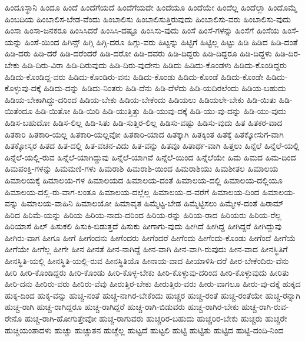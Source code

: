 {ಹಿಂದೂಸ್ಥಾನಿ
ಹಿಂದೂ
ಹಿಂದೆ
ಹಿಂದೆಗೆಯದೆ
ಹಿಂದೆಗೆಯದೇ
ಹಿಂದೆಯೂ
ಹಿಂದೆಯೇ
ಹಿಂದೆಲ್ಲ
ಹಿಂದೆಲ್ಲಾ
ಹಿಂದೊಮ್ಮೆ
ಹಿಂಬದಿಯ
ಹಿಂಬಾಲಿಸ-ಬೇಡ-ವೆಂದು
ಹಿಂಬಾಲಿಸು
ಹಿಂಬಾಲಿಸುತ್ತಿರುವುದು
ಹಿಂಬಾಲಿಸು-ವರು
ಹಿಂಬಾಲಿಸು-ವುದು
ಹಿಂಸಾ
ಹಿಂಸಾ-ಜನಕರೂ
ಹಿಂಸಿಸಿದರೆ
ಹಿಂಸಿಸಿ-ದಷ್ಟೂ
ಹಿಂಸಿಸು-ವುದು
ಹಿಂಸೆ
ಹಿಂಸೆ-ಗಳನ್ನು
ಹಿಂಸೆಗೆ
ಹಿಂಸೆಯ
ಹಿಂಸೆ-ಯನ್ನು
ಹಿಂಸೆ-ಯಿಂದ
ಹಿಗಿನ್ಸ್
ಹಿಗ್ಗಿ
ಹಿಗ್ಗಿ-ದರೂ
ಹಿಗ್ಗು-ವರು
ಹಿಟ್ಟನ್ನು
ಹಿಟ್ಟಿಗೆ
ಹಿಟ್ಟಿಲ್ಲ
ಹಿಟ್ಟು
ಹಿಡಿ
ಹಿಡಿದ
ಹಿಡಿ-ದಂತೆ
ಹಿಡಿ-ದರು
ಹಿಡಿ-ದರೆ
ಹಿಡಿ-ದರೆಂದರೆ
ಹಿಡಿ-ದರೋ
ಹಿಡಿ-ದವರು
ಹಿಡಿ-ದಿದ್ದರು
ಹಿಡಿ-ದಿದ್ದರೂ
ಹಿಡಿ-ದಿದ್ದಳು
ಹಿಡಿ-ದಿರ-ಬೇಕು
ಹಿಡಿ-ದಿರು-ವಿರಾ
ಹಿಡಿ-ದಿರುವುದು
ಹಿಡಿ-ದಿರು-ವುದೇನು
ಹಿಡಿದು
ಹಿಡಿದು-ಕೊಂಡಳು
ಹಿಡಿದು-ಕೊಂಡಿದ್ದರು
ಹಿಡಿದು-ಕೊಂಡಿದ್ದ-ವರು
ಹಿಡಿದು-ಕೊಂಡಿರು-ವನು
ಹಿಡಿದು-ಕೊಂಡು
ಹಿಡಿದು-ಕೊಂಡೆ
ಹಿಡಿದು-ಕೊಂಡೇ
ಹಿಡಿದು-ಕೊಳ್ಳುವು-ದಕ್ಕೆ
ಹಿಡಿದು-ದನ್ನು
ಹಿಡಿದು-ನಿಂತರು
ಹಿಡಿ-ದೆನು
ಹಿಡಿ-ದೆಳೆದು
ಹಿಡಿ-ಯದಿರಲೆಂದು
ಹಿಡಿಯ-ಬಹುದು
ಹಿಡಿಯ-ಬೇಕಾಗಿದ್ದು-ದರಿಂದ
ಹಿಡಿಯ-ಬೇಕು
ಹಿಡಿಯ-ಬೇಕೆಂದು
ಹಿಡಿಯಲು
ಹಿಡಿಯಲೇ-ಬೇಕು
ಹಿಡಿ-ಯಿತು
ಹಿಡಿ-ಯಿತೆಂದೂ
ಹಿಡಿ-ಯಿತೋ
ಹಿಡಿ-ಯಿರಿ
ಹಿಡಿ-ಯುತ್ತಿತ್ತು
ಹಿಡಿ-ಯುವು-ದಕ್ಕೆ
ಹಿಡಿ-ಯು-ವು-ದನ್ನು
ಹಿಡಿ-ಯು-ವುದು
ಹಿಡಿಸ-ಬಹುದೋ
ಹಿಡಿಸ-ಲಿಲ್ಲ
ಹಿಡಿ-ಸಿತು
ಹಿಡಿ-ಸುತ್ತಿರ-ಲಿಲ್ಲ
ಹಿಡಿಸು-ವಷ್ಟು
ಹಿಡಿಸು-ವುದು
ಹಿತ
ಹಿತಕರ-ವಾದ
ಹಿತಕಾರಿ
ಹಿತಕಾರಿ-ಯಲ್ಲ
ಹಿತಕಾರಿ-ಯಲ್ಲವೋ
ಹಿತಕಾರಿ-ಯಾದ
ಹಿತಕ್ಕಾಗಿ
ಹಿತಕ್ಕಿಂತ
ಹಿತಕ್ಕೆ
ಹಿತಕ್ಕೋಸುಗ-ವಾಗಿ
ಹಿತಕ್ಕೋಸ್ಕರ
ಹಿತದ
ಹಿತ-ದಲ್ಲಿ
ಹಿತ-ವಚನ-ವಿದು
ಹಿತ-ವನ್ನು
ಹಿತವೂ
ಹಿತಾರ್ಥ-ವಾಗಿ
ಹಿತ್ತಲು
ಹಿನ್ನೆಲೆ
ಹಿನ್ನೆಲೆ-ಯಲ್ಲಿ
ಹಿನ್ನೆಲೆ-ಯಲ್ಲಿ-ರುವ
ಹಿನ್ನೆಲೆ-ಯಾಗಿದ್ದುವು
ಹಿನ್ನೆಲೆ-ಯಾಗಿವೆ
ಹಿನ್ನೆಲೆ-ಯಿಂದ
ಹಿನ್ನೆಲೆಯೇ
ಹಿಮ
ಹಿಮದ
ಹಿಮ-ದಿಂದ
ಹಿಮಪಂಕ್ತಿ-ಗಳನ್ನು
ಹಿಮಮಣಿ-ಗಳು
ಹಿಮರಾಶಿ
ಹಿಮರಾಶಿ-ಯಿಂದ
ಹಿಮರಾಶಿಯು
ಹಿಮಶೀತಲ
ಹಿಮಾಲಯ
ಹಿಮಾಲಯಕ್ಕೆ
ಹಿಮಾಲಯ-ಗಳ
ಹಿಮಾಲಯದ
ಹಿಮಾಲಯ-ದಂತೆ
ಹಿಮಾಲಯ-ದಲ್ಲಿ
ಹಿಮಾಲಯ-ದಲ್ಲಿಯೂ
ಹಿಮಾಲಯ-ದಲ್ಲಿ-ರು-ವಾಗ-ಲಂತೂ
ಹಿಮಾಲಯ-ದಲ್ಲೆಲ್ಲ
ಹಿಮಾಲಯ-ದ-ವರೆಗೆ
ಹಿಮಾಲಯ-ದಿಂದ
ಹಿಮಾಲಯ-ವನ್ನು
ಹಿಮಾಲಯ-ವಾಹಿನಿ
ಹಿಮಾಲಯೋ
ಹಿಮಾವೃತ
ಹಿಮ್ಮೆಟ್ಟ-ಬೇಡ
ಹಿಮ್ಮೆಟ್ಟಿಸಲು
ಹಿಮ್ಮೇಳ-ದಂತೆ
ಹಿರಾಮ್
ಹಿರಿದ
ಹಿರಿಮೆ-ಯನ್ನು
ಹಿರಿಯ
ಹಿರಿಯ-ನಾದು-ದರಿಂದ
ಹಿರಿಯ-ರನ್ನು
ಹಿರಿಯ-ರಾದ
ಹಿರಿಯರು
ಹಿರಿಯ-ರೆಲ್ಲ
ಹಿರಿಯಾಸೆ
ಹಿಲ್
ಹಿಸುಕಲಿ
ಹಿಸುಕಿ-ಬಿಡುತ್ತದೆ
ಹಿಸುಕು
ಹೀಗಾಗು-ವುದು
ಹೀಗಿದೆ
ಹೀಗಿದ್ದ
ಹೀಗಿದ್ದರೆ
ಹೀಗಿದ್ದುವು
ಹೀಗಿರು-ವಾಗ
ಹೀಗೂ
ಹೀಗೆ
ಹೀಗೆಂದನು
ಹೀಗೆಂದರು
ಹೀಗೆಂದರೆ
ಹೀಗೆಂದು
ಹೀಗೆಂದು-ಕೊಂಡು
ಹೀಗೆಂದೆ
ಹೀಗೆಯೆ
ಹೀಗೆಯೇ
ಹೀಗೆಲ್ಲ
ಹೀಗೇ
ಹೀನ
ಹೀನತೆ
ಹೀನ-ನಾಗಿದ್ದೆ
ಹೀನ-ವಾಗಿ
ಹೀನ-ವಾಗಿ-ರುವುದು
ಹೀನ-ವಾದ
ಹೀನಸ್ಥಿತಿಗೆ
ಹೀನಸ್ಥಿತಿ-ಯಲ್ಲಿ
ಹೀನಸ್ಥಿತಿ-ಯಲ್ಲಿ-ರುವ
ಹೀನಸ್ಥಿತಿಯೊ
ಹೀನಾಯ-ವಾದ
ಹೀಯಾಳಿಸಿ-ದರೆ
ಹೀರ-ಬೇಕೆಂದಿರು-ವೆನು
ಹೀರಿ
ಹೀರಿ-ಕೊಂಡಿದ್ದರು
ಹೀರಿ-ಕೊಂಡು
ಹೀರಿ-ಕೊಳ್ಳ-ಬೇಕು
ಹೀರಿ-ಕೊಳ್ಳುವು-ದರಿಂದ
ಹೀರಿ-ಕೊಳ್ಳುವುದು
ಹೀರಿತು
ಹೀರಿ-ದನು
ಹೀರಿರು-ವರು
ಹೀರಿರು-ವೆವು
ಹೀರುತ್ತಿರ-ಬೇಕು
ಹೀರುತ್ತಿರು-ವರು
ಹೀರು-ವಾಗಲೂ
ಹೀರು-ವು-ದಕ್ಕೆ
ಹುಕ್ಕದ
ಹುಕ್ಕ-ದಿಂದ
ಹುಕ್ಕ-ವನ್ನು
ಹುಚ್ಚ-ನಂತೆ
ಹುಚ್ಚ-ನಾಗಿರ-ಬೇಕೆಂದು
ಹುಚ್ಚರ
ಹುಚ್ಚ-ರಂತೆ
ಹುಚ್ಚ-ರಂತೆಯೇ
ಹುಚ್ಚ-ರನ್ನಾಗಿ
ಹುಚ್ಚ-ರಾಗಿ
ಹುಚ್ಚ-ರಾಗಿದ್ದರೂ
ಹುಚ್ಚ-ರಾಗಿದ್ದರೆ
ಹುಚ್ಚ-ರಾಗಿ-ಬಿಡುವರು
ಹುಚ್ಚ-ರಾಗಿರ-ಬೇಕು
ಹುಚ್ಚ-ರಾಗಿ-ರುವ-ರೇನೊ
ಹುಚ್ಚ-ರಾಗಿ-ಹೋಗುತ್ತೇವೋ
ಹುಚ್ಚ-ರಾಗುವರು
ಹುಚ್ಚರಿರ-ಬಹುದು
ಹುಚ್ಚರಿರ-ಬೇಕು
ಹುಚ್ಚರು
ಹುಚ್ಚರೇ
ಹುಚ್ಚಿಯಂತಾದಳು
ಹುಚ್ಚು
ಹುಚ್ಚುತನ
ಹುಚ್ಚೆಲ್ಲ
ಹುಟ್ಟದೆ
ಹುಟ್ಟಲಿ
ಹುಟ್ಟಿ
ಹುಟ್ಟಿತು
ಹುಟ್ಟಿದ
ಹುಟ್ಟಿ-ದಂದಿ-ನಿಂದ
}
